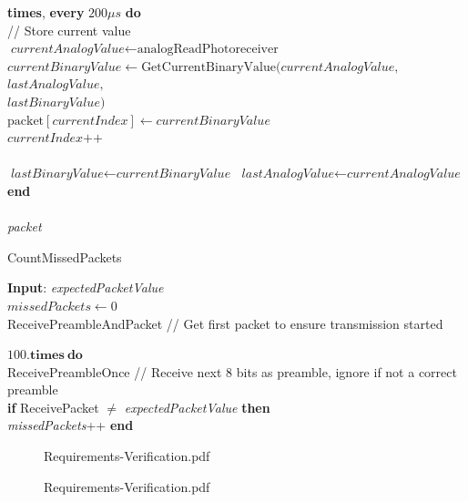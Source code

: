 \documentclass[letterpaper,10pt]{article}
\begin{document}
\begin{spacing}{1.15}
\begin{algorithm}[H]
\begin{algorithmic}[1]
		 \textbf{times}, \textbf{every} $200 \mu s$ \textbf{do}\\
		\quad // Store current value\\
		\quad $\textit{currentAnalogValue} \gets \text{analogReadPhotoreceiver}$\\
		\quad $\textit{currentBinaryValue} \gets \text{GetCurrentBinaryValue}(\textit{currentAnalogValue},$\\ 
		\hspace{7.65cm} $\textit{lastAnalogValue},$\\
		\hspace{7.65cm} $\textit{lastBinaryValue})$ \\
		\quad $\text{packet}[\textit{currentIndex}] \gets \textit{currentBinaryValue}$\\
		\quad $\textit{currentIndex}\text{++}$\\\\
		
		\State \quad $\textit{lastBinaryValue} \gets \textit{currentBinaryValue}$
		\State \quad $\textit{lastAnalogValue} \gets \textit{currentAnalogValue}$
		\State \textbf{end}\\\\
		
		\Return \textit{packet}
	\end{algorithmic}
\end{algorithm}

\begin{algorithm}[H]
	\caption{CountMissedPackets}\label{algo-4}
	\begin{algorithmic}[1]
		\State \textbf{Input}: \textit{expectedPacketValue}\\
		\State $\textit{missedPackets} \gets 0$\\
		ReceivePreambleAndPacket // Get first packet to ensure transmission started
		
		\State $100.\textbf{times}\ \textbf{do}$\\
		\quad ReceivePreambleOnce // Receive next 8 bits as preamble, ignore if not a correct preamble \\
		\quad \textbf{if} ReceivePacket $\neq$ \textit{expectedPacketValue} \textbf{then} \\
		\quad \quad \textit{missedPackets}++
		\State \textbf{end}
	\end{algorithmic}
\end{algorithm}
\clearpage

\begin{figure} [H]
	\centering
	 {Requirements-Verification.pdf}
\end{figure}
\clearpage

\begin{figure} [H]
	\centering
	 {Requirements-Verification.pdf}
\end{figure}

\end{spacing}
\end{document}
